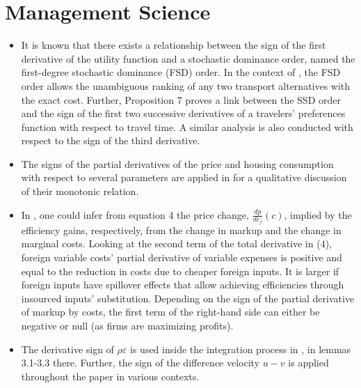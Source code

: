 \documentclass[11pt]{book}
\begin{document}
\section{Management Science}
\begin{itemize}
\item It is known that there exists a relationship between the sign of the
first derivative of the utility function and a stochastic dominance
order, named the first-degree stochastic dominance (FSD) order. In
the context of \cite{beaud2016impact},
the FSD order allows the unambiguous ranking of any two transport
alternatives with the exact cost. Further, Proposition 7 proves a
link between the SSD order and the sign of the first two successive
derivatives of a travelers\textquoteright{} preferences function with
respect to travel time. A similar analysis is also conducted with
respect to the sign of the third derivative.
\item The signs of the partial derivatives of the price and housing consumption
with respect to several parameters are applied in \cite{basso2017effects}
for a qualitative discussion of their monotonic relation.
\item In \cite{navarramarkup},
one could infer from equation 4 the price change, $\frac{dp}{dc_{f}}\left(c\right)$,
implied by the efficiency gains, respectively, from the change in
markup and the change in marginal costs. Looking at the second term
of the total derivative in (4), foreign variable costs' partial derivative
of variable expenses is positive and equal to the reduction in costs
due to cheaper foreign inputs. It is larger if foreign inputs have
spillover effects that allow achieving efficiencies through insourced
inputs' substitution. Depending on the sign of the partial derivative
of markup by costs, the first term of the right-hand side can either
be negative or null (as firms are maximizing profits).
\item The derivative sign of $\rho\varepsilon$ is used inside the integration
process in \cite{chiarello2020non},
in lemmas 3.1-3.3 there. Further, the sign of the difference velocity
$u-v$ is applied throughout the paper in various contexts.
\end{itemize}

\end{document}
